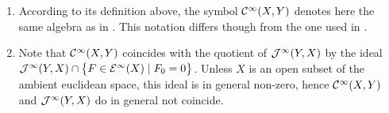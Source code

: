 \begin{remark}
  \begin{enumerate}
  \item  According to its definition above, the symbol $\mathcal{C}^\infty (X,Y)$ denotes here the same algebra as in 
  \cite{BieMilPawCDF}. This notation differs though from the one used in \cite{BieSchwaCLDEF}.  
  \item  Note that  $\mathcal{C}^\infty (X,Y)$ coincides with the quotient of $\mathcal{J}^\infty (Y,X)$ by the 
     ideal $\mathcal{J}^\infty (Y,X) \cap \big\{ F \in \mathcal{E}^\infty (X) \mid F_0 = 0 \big\}$. Unless $X$ 
     is an open subset of the ambient euclidean space, this ideal is in general non-zero, hence   
     $\mathcal{C}^\infty (X,Y)$ and  $\mathcal{J}^\infty (Y,X)$ do in general not coincide.      
  \end{enumerate}

 
\end{remark}

